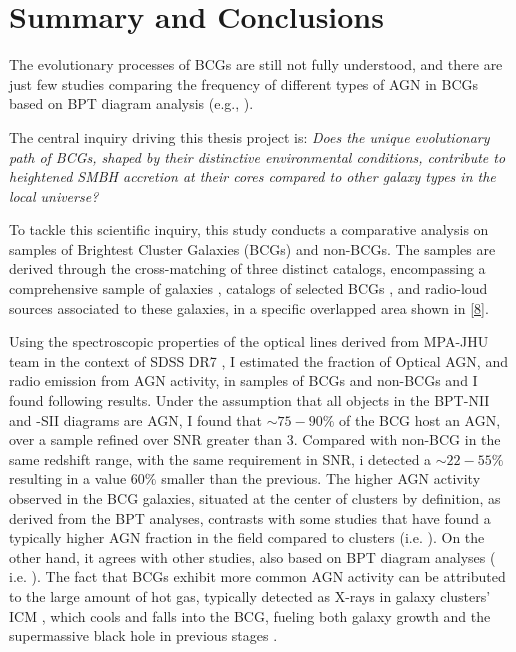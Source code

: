 \chapter*{Summary and Conclusions}

The evolutionary processes of BCGs are still not fully understood, and there are just few
studies comparing the frequency of different types of AGN in BCGs based on BPT diagram analysis (e.g., \cite{2019CoBAO..66..153F}).

The central inquiry driving this thesis project is: \textit{Does the unique evolutionary path of BCGs, shaped by their distinctive environmental conditions, contribute to heightened SMBH accretion at their cores compared to other galaxy types in the local universe?}

To tackle this scientific inquiry, this study conducts a comparative analysis on samples of Brightest Cluster Galaxies (BCGs) and non-BCGs. The samples are derived through the cross-matching of three distinct catalogs, encompassing a comprehensive sample of galaxies \cite{2009ApJS..182..543A}, catalogs of selected BCGs  \cite{2009yCat..73790867V}, and radio-loud sources \cite{2005MNRAS.362....9B} associated to these galaxies, in a specific overlapped area shown in \autoref{8}.

Using the spectroscopic properties of the optical lines derived from MPA-JHU team in the context of SDSS DR7 \cite{mpa-sdss-dr7, 2009ApJS..182..543A}, I estimated the fraction of Optical AGN, and radio emission from AGN activity, in samples of BCGs and non-BCGs and I found following results.
Under the assumption that all objects in the BPT-NII and -SII diagrams are AGN, I found that $\sim75-90\%$ of the BCG host an AGN, over a sample refined over SNR greater than 3.
Compared with non-BCG in the same redshift range, with the same requirement in SNR, i detected a $\sim 22-55\%$ resulting in a value $60\%$ smaller than the previous. The higher AGN activity observed in the BCG galaxies, situated at the center of clusters by definition, as derived from the BPT analyses, contrasts with some studies that have found a typically higher AGN fraction in the field compared to clusters (i.e. \cite{2017MNRAS.472..409L}).  On the other hand, it agrees with other studies, also based on BPT diagram analyses ( i.e. \cite{2012A&A...538A..15H}).  The fact that BCGs exhibit more common AGN activity can be attributed to the large amount of hot gas, typically detected as X-rays in galaxy clusters' ICM , which cools and falls into the BCG, fueling both galaxy growth and the supermassive black hole in previous stages \cite{2012A&A...538A..15H}. 

